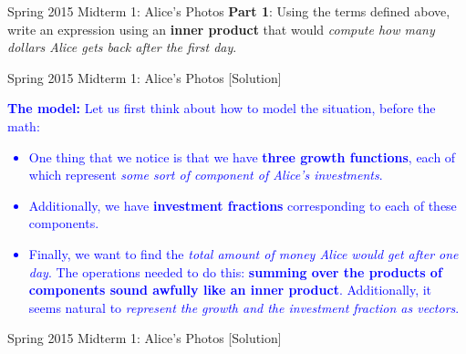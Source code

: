 \begin{frame}{Spring 2015 Midterm 1: Alice's Photos}
    \textbf{Part 1}: Using the terms defined above, write an expression using an \textbf{inner product} that would \textit{compute how many dollars Alice gets back after the first day}. 
\end{frame}

\begin{frame}{Spring 2015 Midterm 1: Alice's Photos [Solution]}
    \textcolor{blue}{
        \textbf{The model:} Let us first think about how to model the situation, before the math:
        \begin{itemize}
            \color{blue}
            \item<blue@1-> One thing that we notice is that we have \textbf{three growth functions}, each of which represent \textit{some sort of component of Alice’s investments}.  
            \item<blue@1-> Additionally, we have \textbf{investment fractions} corresponding to each of these components.  
            \item<blue@1-> Finally, we want to find the \textit{total amount of money Alice would get after one day}.  The operations needed to do this: \textbf{summing over the products of components sound awfully like an inner product}.  Additionally, it seems natural to \textit{represent the growth and the investment fraction as vectors}.  
        \end{itemize}
    }
\end{frame}

\begin{frame}{Spring 2015 Midterm 1: Alice's Photos [Solution]}
\end{frame}

